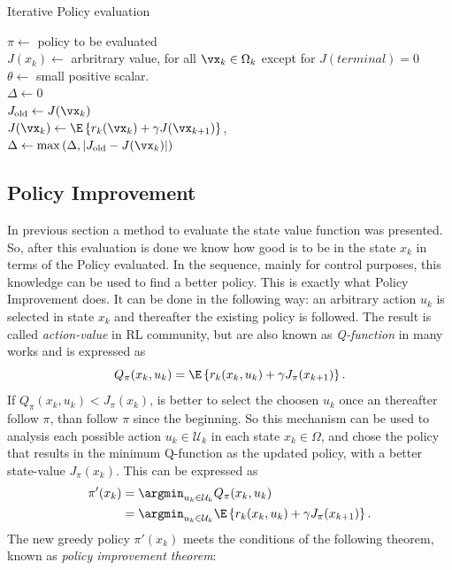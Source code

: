 \begin{algorithm}
  \DontPrintSemicolon
  \caption{Iterative Policy evaluation}\label{alg:IPE} %

  $\pi \gets$ policy to be evaluated \\
  $J(x_k) \gets $ arbritrary value, for all $\vx_k \in \Omega_k$ except for $J(terminal) = 0$\\
  $\theta \gets $ small positive scalar. \\
  \While{$\Delta \ge  \theta$} 
  { 
    $\Delta \gets 0$  \\
    {
      $J_{\text{old}} \gets J(\vx_k)$ \\
      $J(\vx_k) \gets \E \left\{ r_k(\vx_k) + \gamma J(\vx_{k+1}) \right\}$, \\
      $\Delta \gets \max \left(  \Delta,\left| J_{\text{old}} -J(\vx_k) \right| \right)$
    }
  } 
\end{algorithm}

\subsection{Policy Improvement}
\label{sec:PI}

In previous section a method to evaluate the state value function was presented. So, after this evaluation is done we know how good is to be in the state $x_k$ in terms of the Policy evaluated. In the sequence, mainly for control purposes, this knowledge can be used to find a better policy. This is exactly what Policy Improvement does. It can be done in the following way: an arbitrary action $u_k$ is selected in state $x_k$ and thereafter the existing policy is followed. The result is called \textit{action-value} in RL community, but are also known as \textit{Q-function} in many works \citep{watkins1992,lewis2012} and is expressed as
\begin{equation}
  Q_\pi(x_k,u_k) = \E\left\{r_k(x_k,u_k) + \gamma J_\pi(x_{k+1})\right\}
\label{eq:qfunction1}.
\end{equation}
If $Q_\pi(x_k,u_k) < J_\pi(x_k)$, is better to select the choosen $u_k$ once an thereafter follow $\pi$, than follow $\pi$ since the beginning. So this mechanism can be used to analysis each possible action $u_k \in \mathcal{U}_k$ in each state $x_k \in \Omega$, and chose the policy that results in the minimum Q-function as the updated policy, with a better state-value $J_\pi(x_k)$. This can be expressed as
\begin{align}
  \pi'(x_k) &= \argmin_{u_k \in \mathcal{U}_k} Q_\pi(x_k,u_k) \label{eq:QminPI_1} \\
            &= \argmin_{u_k \in \mathcal{U}_k} \E\left\{r_k(x_k,u_k) + \gamma J_\pi(x_{k+1})\right\}
\label{eq:QminPI_2}.
\end{align}
The new greedy policy $\pi'(x_k)$ meets the conditions of the following theorem, known as \textit{policy improvement theorem}:


